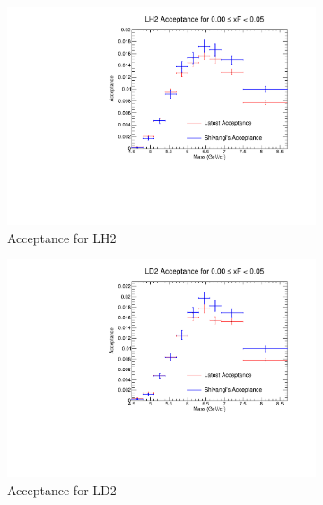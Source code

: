 \documentclass[11pt]{article}
\begin{document}
\begin{figure}[p]
    \centering
    \begin{subfigure}[b]{0.48\textwidth}
       \includegraphics[width=\linewidth]{./acceptancePlots/LH2_acceptance_xF_bin_0.pdf}
       \caption{Acceptance for LH2}
    \end{subfigure}\hfill
    \begin{subfigure}[b]{0.48\textwidth}
       \includegraphics[width=\linewidth]{./acceptancePlots/LD2_acceptance_xF_bin_0.pdf}
       \caption{Acceptance for LD2}
    \end{subfigure}
    \begin{subfigure}[b]{0.48\textwidth}

\end{subfigure}
\end{figure}
\end{document}
